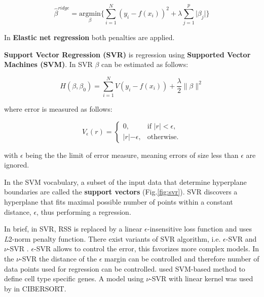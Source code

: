 \documentclass[12pt,]{book}
\theoremstyle{definition}
\theoremstyle{definition}
\theoremstyle{definition}
\theoremstyle{remark}
\begin{document}
\begin{equation}
\hat{\beta}^{ridge} = \underset{\beta}{\text{argmin}}\{\sum_{i = 1}^{N}(y_i - f(x_i))^2 + \lambda\sum_{j=1}^{p}\lvert\beta_j\rvert\}\label{eq:lasso}
\end{equation}

In \textbf{Elastic net regression} both penalties are applied.

\textbf{Support Vector Regression (SVR)} is regression using
\textbf{Supported Vector Machines (SVM)}. In SVR \(\beta\) can be
estimated as follows:

\begin{equation}
H(\beta,\beta_0) = \sum_{i=1}^{N} V (y_i − f(x_i)) +\frac{λ}2\lVert\beta\rVert^2 \label{eq:svr1}
\end{equation}

where error is measured as follows:

\begin{equation}
V_\epsilon(r) = \begin{cases}
    0, & \text{if $\lvert r \rvert < \epsilon$,}\\
    \rvert r\lvert - \epsilon, & \text{otherwise}.
  \end{cases}  \label{eq:svr2}
\end{equation}

with \(\epsilon\) being the the limit of error measure, meaning errors
of size less than \(\epsilon\) are ignored.

In the SVM vocabulary, a subset of the input data that determine
hyperplane boundaries are called the \textbf{support vectors}
(Fig.\ref{fig:svr}). SVR discovers a hyperplane that fits maximal
possible number of points within a constant distance, \(\epsilon\), thus
performing a regression.

In brief, in SVR, RSS is replaced by a linear \(\epsilon\)-insensitive
loss function and uses \emph{L}2-norm penalty function. There exist
variants of SVR algorithm, i.e. \(\epsilon\)-SVR \citep{drucker1997} and
\(\nu\)-SVR \citep{Scholkopf2000}. \(\epsilon\)-SVR allows to control
the error, this favorizes more complex models. In the \(\nu\)-SVR the
distance of the \(\epsilon\) margin can be controlled and therefore
number of data points used for regression can be controlled.
\citet{Ju2013} used SVM-based method to define cell type specific genes.
A model using \(\nu\)-SVR with linear kernel was used by
\citet{Newman2015} in CIBERSORT.
\end{document}
